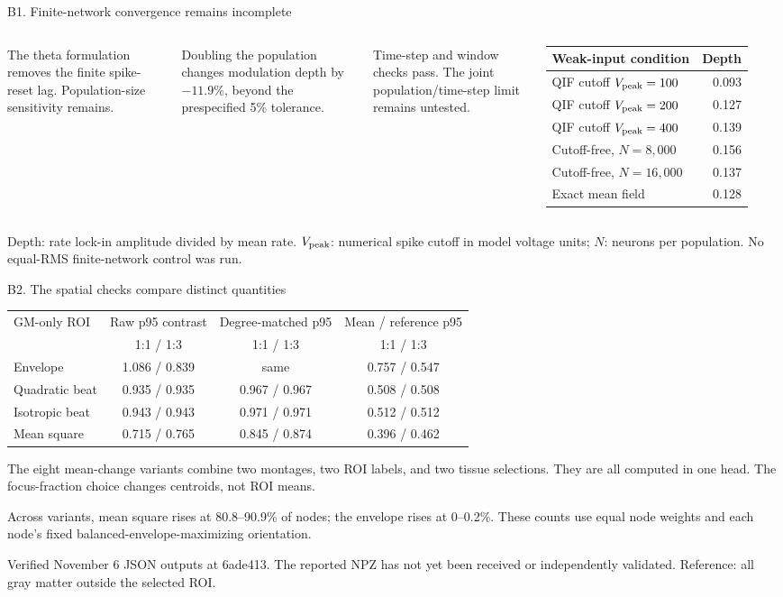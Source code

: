 \documentclass[aspectratio=169,11pt]{beamer}
\newcommand{\source}[1]{\vfill{\color{muted}\fontsize{6.5}{8}\selectfont #1\par}}
\begin{document}
\appendix
\begin{frame}[t]{B1. Finite-network convergence remains incomplete}
\begin{columns}[T,onlytextwidth]
The theta formulation removes the finite spike-reset lag. Population-size sensitivity remains.

Doubling the population changes modulation depth by $-11.9\%$, beyond the prespecified 5\% tolerance.

Time-step and window checks pass. The joint population/time-step limit remains untested.
\small
\renewcommand{\arraystretch}{1.35}
\begin{tabular}{@{}lr@{}}
\toprule
Weak-input condition & Depth\\
\midrule
QIF cutoff $V_{\rm peak}=100$ & 0.093\\
QIF cutoff $V_{\rm peak}=200$ & 0.127\\
QIF cutoff $V_{\rm peak}=400$ & 0.139\\
Cutoff-free, $N=8{,}000$ & 0.156\\
Cutoff-free, $N=16{,}000$ & 0.137\\
Exact mean field & 0.128\\
\bottomrule
\end{tabular}
\end{columns}
\source{Depth: rate lock-in amplitude divided by mean rate. $V_{\rm peak}$: numerical spike cutoff in model voltage units; $N$: neurons per population. No equal-RMS finite-network control was run.}
\end{frame}

\begin{frame}[t]{B2. The spatial checks compare distinct quantities}
\small
\renewcommand{\arraystretch}{1.2}
\begin{tabular}{@{}lccc@{}}
\toprule
GM-only ROI & Raw p95 contrast & Degree-matched p95 & Mean / reference p95\\
& 1:1 / 1:3 & 1:1 / 1:3 & 1:1 / 1:3\\
\midrule
Envelope & 1.086 / 0.839 & same & 0.757 / 0.547\\
Quadratic beat & 0.935 / 0.935 & 0.967 / 0.967 & 0.508 / 0.508\\
Isotropic beat & 0.943 / 0.943 & 0.971 / 0.971 & 0.512 / 0.512\\
Mean square & 0.715 / 0.765 & 0.845 / 0.874 & 0.396 / 0.462\\
\bottomrule
\end{tabular}

\vspace{3mm}
The eight mean-change variants combine two montages, two ROI labels, and two tissue selections.
They are all computed in one head. The focus-fraction choice changes centroids, not ROI means.

Across variants, mean square rises at 80.8--90.9\% of nodes; the envelope rises at 0--0.2\%.
These counts use equal node weights and each node's fixed balanced-envelope-maximizing orientation.

\source{Verified November 6 JSON outputs at 6ade413. The reported NPZ has not yet been received or independently validated. Reference: all gray matter outside the selected ROI.}
\end{frame}
\end{document}
